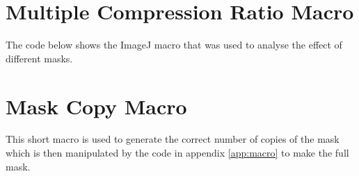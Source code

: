 \appendix
\newpage
{}


\section{Multiple Compression Ratio Macro}
The code below shows the ImageJ macro that was used to analyse the effect of different masks.
\label{app:macro}
\scriptsize

\section{Mask Copy Macro}
This short macro is used to generate the correct number of copies of the mask which is then manipulated by the code in appendix \ref{app:macro} to make the full mask.
\label{app:macro2}
\scriptsize
